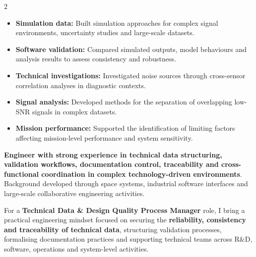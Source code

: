 \documentclass[8pt,a4paper,ragged2e,withhyper]{altacv}
\begin{document}
\begin{paracol}{2}
\begin{itemize}
  \item \textbf{Simulation data:} Built simulation approaches for complex signal environments, uncertainty studies and large-scale datasets.
  \item \textbf{Software validation:} Compared simulated outputs, model behaviours and analysis results to assess consistency and robustness.
  \item \textbf{Technical investigations:} Investigated noise sources through cross-sensor correlation analyses in diagnostic contexts.
  \item \textbf{Signal analysis:} Developed methods for the separation of overlapping low-SNR signals in complex datasets.
  \item \textbf{Mission performance:} Supported the identification of limiting factors affecting mission-level performance and system sensitivity.
\end{itemize}

\switchcolumn


\textbf{Engineer with strong experience in technical data structuring, validation workflows, documentation control, traceability and cross-functional coordination in complex technology-driven environments}. Background developed through space systems, industrial software interfaces and large-scale collaborative engineering activities.

For a \textbf{Technical Data \& Design Quality Process Manager} role, I bring a practical engineering mindset focused on securing the \textbf{reliability, consistency and traceability of technical data}, structuring validation processes, formalising documentation practices and supporting technical teams across R\&D, software, operations and system-level activities.


\end{paracol}
\end{document}
